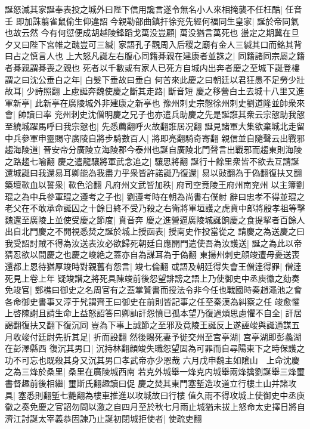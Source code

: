 誕怒滅其家誕奉表投之城外曰陛下信用讒言遂令無名小人來相掩襲不任枉酷|{
	任音壬}
即加誅翦雀鼠偷生仰違詔今親勒部曲鎮扞徐兖先經何福同生皇家|{
	誕於帝同氣也故云然}
今有何愆便成胡越陵鋒蹈戈萬没豈顧|{
	萬没猶言萬死也}
盪定之期冀在旦夕又曰陛下宮帷之醜豈可三緘|{
	家語孔子觀周入后稷之廟有金人三緘其口而銘其背曰占之慎言人也}
上大怒凡誕左右腹心同籍朞親在建康者並誅之|{
	同籍諸同宗屬之籍者朞親謂朞喪之親也}
死者以千數或有家人已死方自城内出奔者慶之至城下誕登樓謂之曰沈公垂白之年|{
	白髮下垂故曰垂白}
何苦來此慶之曰朝廷以君狂愚不足勞少壯故耳|{
	少詩照翻}
上慮誕奔魏使慶之斷其走路|{
	斷音短}
慶之移營白土去城十八里又進軍新亭|{
	此新亭在廣陵城外非建康之新亭也}
豫州刺史宗慤徐州刺史劉道隆並帥衆來會|{
	帥讀曰率}
兖州刺史沈僧明慶之兄子也亦遣兵助慶之先是誕誑其衆云宗慤助我慤至繞城躍馬呼曰我宗慤也|{
	先悉薦翻呼火故翻誑居况翻}
誕見諸軍大集欲棄城北走留中兵參軍申靈賜守廣陵自將步騎數百人|{
	將即亮翻騎奇寄翻}
親信並自隨聲云出戰邪趨海陵道|{
	晉安帝分廣陵立海陵郡今泰州也誕自廣陵北門聲言出戰邪而趨東則海陵之路趨七喻翻}
慶之遣龍驤將軍武念追之|{
	驤思將翻}
誕行十餘里衆皆不欲去互請誕還城誕曰我還易耳卿能為我盡力乎衆皆許諾誕乃復還|{
	易以䜴翻為于偽翻復扶又翻}
築壇㰱血以誓衆|{
	㰱色洽翻}
凡府州文武皆加秩|{
	府司空竟陵王府州南兖州}
以主簿劉琨之為中兵參軍琨之遵考之子也|{
	劉遵考時在朝為尚書右僕射}
辭曰忠孝不得並琨之老父在不敢承命誕囚之十餘日終不受乃殺之右衛將軍垣護之虎賁中郎將殷孝祖等擊魏還至廣陵上並使受慶之節度|{
	賁音奔}
慶之進營逼廣陵城誕餉慶之食提挈者百餘人出自北門慶之不開視悉焚之誕於城上授函表|{
	授南史作投當從之}
請慶之為送慶之曰我受詔討賊不得為汝送表汝必欲歸死朝廷自應開門遣使吾為汝護送|{
	誕之為此以帝猜忍欲以間慶之也慶之峻絶之蓋亦自為謀耳為于偽翻}
東揚州刺史顔竣遭母憂送喪還都上恩待猶厚竣時對親舊有怨言|{
	竣七倫翻}
或語及朝廷得失會王僧逹得罪|{
	僧逹死見上卷上年}
疑竣譖之將死具陳竣前後怨望誹謗之語上乃使御史中丞庾徽之劾奏免竣官|{
	鄭樵曰御史之名周官有之蓋掌贊書而授法令非今任也戰國時秦趙澠池之會各命御史書事又淳于髠謂齊王曰御史在前則皆記事之任至秦漢為糾察之任}
竣愈懼上啓陳謝且請生命上益怒詔答曰卿訕訐怨憤已孤本望乃復過煩思慮懼不自全|{
	訐居謁翻復扶又翻下復沉同}
豈為下事上誠節之至邪及竟陵王誕反上遂誣竣與誕通謀五月收竣付廷尉先折其足|{
	折而設翻}
然後賜死妻予徙交州至宫亭湖|{
	宫亭湖即彭蠡湖在彭澤縣西}
復沉其男口|{
	沉持林翻顔竣失職怨望固為可罪而自尋陽東下之時保護之功不可忘也既殺其身又沉其男口孝武帝亦少恩哉}
六月戊申魏主如隂山　上命沈慶之為三烽於桑里|{
	桑里在廣陵城西南}
若克外城舉一烽克内城舉兩烽擒劉誕舉三烽璽書督趣前後相繼|{
	璽斯氏翻趣讀曰促}
慶之焚其東門塞塹造攻道立行樓土山并諸攻具|{
	塞悉則翻塹七艷翻為樓車推進以攻城故曰行樓}
值久雨不得攻城上使御史中丞庾徽之奏免慶之官詔勿問以激之自四月至於秋七月雨止城猶未拔上怒命太史擇日將自濟江討誕太宰義恭固諫乃止誕初閉城拒使者|{
	使疏吏翻}
